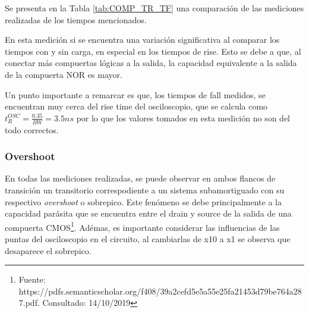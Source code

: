 Se presenta en la Tabla \ref{tab:COMP_TR_TF} una comparaci\'on de las mediciones realizadas de los tiempos mencionados.
\begin{table}[H]
    \centering
    \caption{Tabla de comparaci\'on de tiempos de fall y rise medidos}
    \label{tab:COMP_TR_TF}
    \end{table}
En esta medici\'on si se encuentra una variaci\'on significativa al comparar los tiempos con y sin carga, en especial en los tiempos de rise. Esto se debe a que, al conectar m\'as compuertas l\'ogicas a la salida, la capacidad equivalente a la salida de la compuerta NOR es mayor.

Un punto importante a remarcar es que, los tiempos de fall medidos, se encuentran muy cerca del rise time del osciloscopio, que se calcula como $t_R^{OSC} = \frac{0.35}{BW} = 3.5 ns$ por lo que los valores tomados en esta medici\'on no son del todo correctos. 
\subsubsection{Overshoot}
En todas las mediciones realizadas, se puede observar en ambos flancos de transici\'on un transitorio correspodiente a un sistema subamortiguado con su respectivo \textit{overshoot} o sobrepico. Este fen\'omeno se debe principalmente a la capacidad par\'asita que se encuentra entre el drain y source de la salida de una compuerta CMOS\footnote{Fuente: https://pdfs.semanticscholar.org/f408/39a2cefd5e5a55e25fa21453d79be764a287.pdf. Consultado: 14/10/2019}. Ad\'emas, es importante considerar las influencias de las puntas del osciloscopio en el circuito, al cambiarlas de x10 a x1 se observa que desaparece el sobrepico.


